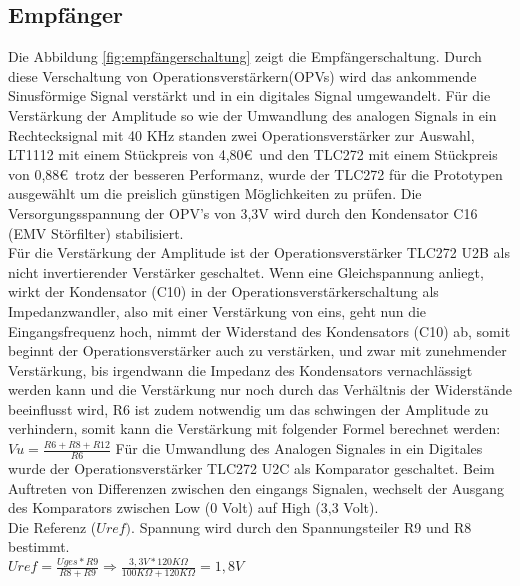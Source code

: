 \subsection{Empfänger}
Die Abbildung \ref{fig:empfängerschaltung} zeigt die Empfängerschaltung. Durch diese Verschaltung von Operationsverstärkern(OPVs) wird das ankommende Sinusförmige Signal verstärkt und in ein digitales Signal umgewandelt. 
Für die Verstärkung der Amplitude so wie der Umwandlung des analogen Signals in ein Rechtecksignal mit 40 KHz standen zwei Operationsverstärker zur Auswahl, LT1112 mit einem Stückpreis von 4,80\euro\ und den TLC272 mit einem Stückpreis von 0,88\euro\ trotz der besseren Performanz, wurde der TLC272 für die Prototypen ausgewählt um die preislich günstigen Möglichkeiten zu prüfen. Die Versorgungsspannung der OPV's von 3,3V wird durch den Kondensator C16 (EMV Störfilter) stabilisiert.\\
Für die Verstärkung der Amplitude ist der Operationsverstärker TLC272 U2B als nicht invertierender Verstärker geschaltet.
Wenn eine Gleichspannung anliegt, wirkt der Kondensator (C10) in der Operationsverstärkerschaltung als Impedanzwandler, also mit einer Verstärkung von eins, geht nun die Eingangsfrequenz hoch, nimmt der Widerstand des Kondensators (C10) ab, somit beginnt der Operationsverstärker auch zu verstärken, und zwar mit zunehmender Verstärkung, bis irgendwann die Impedanz des Kondensators vernachlässigt werden kann und die Verstärkung nur noch durch das Verhältnis der Widerstände beeinflusst wird, R6 ist zudem notwendig um das schwingen der Amplitude zu verhindern, somit kann die Verstärkung mit folgender Formel berechnet werden:
\onehalfspacing \\
\(\displaystyle Vu= \frac{ R6+R8+R12}{R6} \) 
\singlespacing
Für die Umwandlung des Analogen Signales in ein Digitales wurde der Operationsverstärker TLC272 U2C als Komparator geschaltet. Beim Auftreten von Differenzen zwischen den eingangs Signalen, wechselt der Ausgang des Komparators zwischen Low (0 Volt) auf High (3,3 Volt).\\ Die Referenz (\(\displaystyle Uref).\) Spannung wird durch den Spannungsteiler R9 und R8 bestimmt.
\onehalfspacing \\
\(\displaystyle Uref=\frac{Uges*R9}{R8+R9}\Rightarrow\frac{3,3V*120K\Omega}{100K\Omega+120K\Omega}=1,8V \)
\singlespacing

